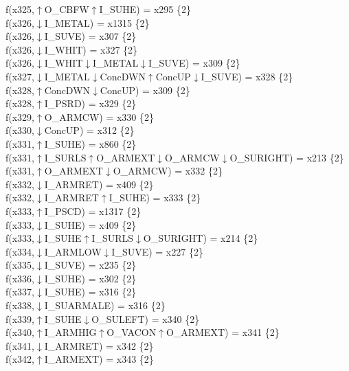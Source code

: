 f(x325,$\uparrow$O\_CBFW$\uparrow$I\_SUHE) = x295 \{2\} \\  
f(x326,$\downarrow$I\_METAL) = x1315 \{2\} \\  
f(x326,$\downarrow$I\_SUVE) = x307 \{2\} \\  
f(x326,$\downarrow$I\_WHIT) = x327 \{2\} \\  
f(x326,$\downarrow$I\_WHIT$\downarrow$I\_METAL$\downarrow$I\_SUVE) = x309 \{2\} \\  
f(x327,$\downarrow$I\_METAL$\downarrow$ConcDWN$\uparrow$ConcUP$\downarrow$I\_SUVE) = x328 \{2\} \\  
f(x328,$\uparrow$ConcDWN$\downarrow$ConcUP) = x309 \{2\} \\  
f(x328,$\uparrow$I\_PSRD) = x329 \{2\} \\  
f(x329,$\uparrow$O\_ARMCW) = x330 \{2\} \\  
f(x330,$\downarrow$ConcUP) = x312 \{2\} \\  
f(x331,$\uparrow$I\_SUHE) = x860 \{2\} \\  
f(x331,$\uparrow$I\_SURLS$\uparrow$O\_ARMEXT$\downarrow$O\_ARMCW$\downarrow$O\_SURIGHT) = x213 \{2\} \\  
f(x331,$\uparrow$O\_ARMEXT$\downarrow$O\_ARMCW) = x332 \{2\} \\  
f(x332,$\downarrow$I\_ARMRET) = x409 \{2\} \\  
f(x332,$\downarrow$I\_ARMRET$\uparrow$I\_SUHE) = x333 \{2\} \\  
f(x333,$\uparrow$I\_PSCD) = x1317 \{2\} \\  
f(x333,$\downarrow$I\_SUHE) = x409 \{2\} \\  
f(x333,$\downarrow$I\_SUHE$\uparrow$I\_SURLS$\downarrow$O\_SURIGHT) = x214 \{2\} \\  
f(x334,$\downarrow$I\_ARMLOW$\downarrow$I\_SUVE) = x227 \{2\} \\  
f(x335,$\downarrow$I\_SUVE) = x235 \{2\} \\  
f(x336,$\downarrow$I\_SUHE) = x302 \{2\} \\  
f(x337,$\downarrow$I\_SUHE) = x316 \{2\} \\  
f(x338,$\downarrow$I\_SUARMALE) = x316 \{2\} \\  
f(x339,$\uparrow$I\_SUHE$\downarrow$O\_SULEFT) = x340 \{2\} \\  
f(x340,$\uparrow$I\_ARMHIG$\uparrow$O\_VACON$\uparrow$O\_ARMEXT) = x341 \{2\} \\  
f(x341,$\downarrow$I\_ARMRET) = x342 \{2\} \\  
f(x342,$\uparrow$I\_ARMEXT) = x343 \{2\} \\  
